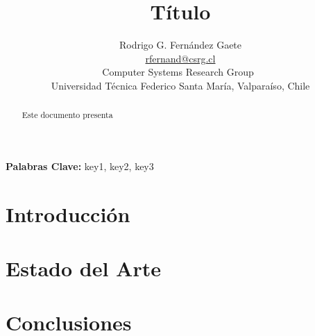 \documentclass[letter, 10pt]{IEEEtran}
\title{Título}
\author{Rodrigo G. Fernández Gaete\\\url{rfernand@csrg.cl}\\
Computer Systems Research Group~\cite{CSRG}\\ Universidad Técnica Federico Santa
María, Valparaíso, Chile}
\begin{document}

\pagestyle{empty}

\maketitle\thispagestyle{empty}

\begin{abstract}
Este documento presenta
\end{abstract}

\textbf{Palabras Clave:}  key1, key2, key3

\section{Introducción}
\label{sec:intro}


\section{Estado del Arte}
\label{sec:estado}


\section{Conclusiones}
\label{sec:conclusiones}




\end{document}
